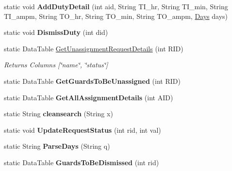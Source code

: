 \begin{DoxyCompactItemize}
static void {\bfseries Add\+Duty\+Detail} (int aid, String T\+I\+\_\+hr, String T\+I\+\_\+min, String T\+I\+\_\+ampm, String T\+O\+\_\+hr, String T\+O\+\_\+min, String T\+O\+\_\+ampm, \hyperlink{class_m_s_a_m_i_s_user_interface_1_1_scheduling_1_1_days}{Days} days)
\item 
\mbox{\label{class_m_s_a_m_i_s_user_interface_1_1_scheduling_ae091aa5205d3dcb266e9c75a822e31c5}} 
static void {\bfseries Dismiss\+Duty} (int did)
\item 
static Data\+Table \hyperlink{class_m_s_a_m_i_s_user_interface_1_1_scheduling_a764ffe5264eec3f9128d114ccceb83fb}{Get\+Unassignment\+Request\+Details} (int R\+ID)
\begin{DoxyCompactList}\small\item\em Returns Columns \mbox{[}\char`\"{}name\char`\"{}, \char`\"{}status\char`\"{}\mbox{]} \end{DoxyCompactList}\item 
\mbox{\label{class_m_s_a_m_i_s_user_interface_1_1_scheduling_ad24d656fd16f6c550bfb2f2121e04b8a}} 
static Data\+Table {\bfseries Get\+Guards\+To\+Be\+Unassigned} (int R\+ID)
\item 
\mbox{\label{class_m_s_a_m_i_s_user_interface_1_1_scheduling_aa4965f6bd4ae4af6c1e0c18b9705fbcb}} 
static Data\+Table {\bfseries Get\+All\+Assignment\+Details} (int A\+ID)
\item 
\mbox{\label{class_m_s_a_m_i_s_user_interface_1_1_scheduling_a234f828a8c5c2cdb7bc7b6e64d23aacf}} 
static String {\bfseries cleansearch} (String x)
\item 
\mbox{\label{class_m_s_a_m_i_s_user_interface_1_1_scheduling_aa4079855bd6fd8cf73a0aefa93c82e1c}} 
static void {\bfseries Update\+Request\+Status} (int rid, int val)
\item 
\mbox{\label{class_m_s_a_m_i_s_user_interface_1_1_scheduling_a9d40d73b2a87b8589508a3240e7de480}} 
static String {\bfseries Parse\+Days} (String q)
\item 
\mbox{\label{class_m_s_a_m_i_s_user_interface_1_1_scheduling_ad559eaf75f2eef8614998cc1e5a2c209}} 
static Data\+Table {\bfseries Guards\+To\+Be\+Dismissed} (int rid)
\end{DoxyCompactItemize}


